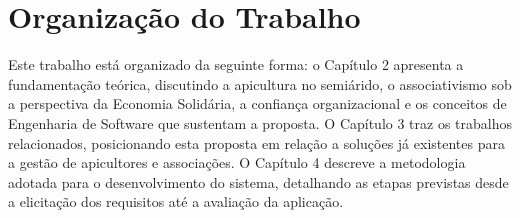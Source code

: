\section{Organização do Trabalho}
\label{sec:orgnaizacao}

Este trabalho está organizado da seguinte forma: o Capítulo 2 apresenta a fundamentação teórica, discutindo a apicultura no semiárido, o associativismo sob a perspectiva da Economia Solidária, a confiança organizacional e os conceitos de Engenharia de Software que sustentam a proposta. O Capítulo 3 traz os trabalhos relacionados, posicionando esta proposta em relação a soluções já existentes para a gestão de apicultores e associações. O Capítulo 4 descreve a metodologia adotada para o desenvolvimento do sistema, detalhando as etapas previstas desde a elicitação dos requisitos até a avaliação da aplicação.